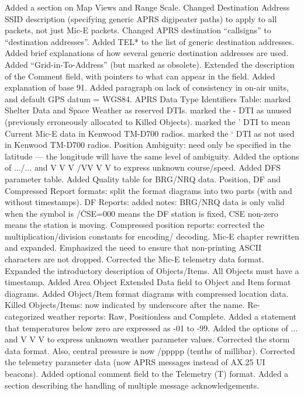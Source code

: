 \begin{itemize}
Added a section on Map Views and Range Scale.
Changed Destination Address SSID description (specifying generic APRS digipeater paths)
to apply to all packets, not just Mic-E packets.
Changed APRS destination “callsigns” to “destination addresses”.
Added TEL* to the list of generic destination addresses.
Added brief explanations of how several generic destination addresses are used.
Added “Grid-in-To-Address” (but marked as obsolete).
Extended the description of the Comment field, with pointers to what can appear in the field.
Added explanation of base 91.
Added paragraph on lack of consistency in on-air units, and default GPS datum = WGS84.
APRS Data Type Identifiers Table:
marked Shelter Data and Space Weather as reserved DTIs.
marked the - DTI as unused (previously erroneously allocated to Killed Objects).
marked the ' DTI to mean Current Mic-E data in Kenwood TM-D700 radios.
marked the ‘ DTI as not used in Kenwood TM-D700 radios.
Position Ambiguity: need only be specified in the latitude — the longitude will have the same
level of ambiguity.
Added the options of .../... and V V V /VV V V to express unknown course/speed.
Added DFS parameter table.
Added Quality table for BRG/NRQ data.
Position, DF and Compressed Report formats: split the format diagrams into two parts (with
and without timestamps).
DF Reports: added notes:
BRG/NRQ data is only valid when the symbol is /\.
CSE=000 means the DF station is fixed, CSE non-zero means the station is moving.
Compressed position reports: corrected the multiplication/division constants for encoding/
decoding.
Mic-E chapter rewritten and expanded. Emphasized the need to ensure that non-printing
ASCII characters are not dropped. Corrected the Mic-E telemetry data format.
Expanded the introductory description of Objects/Items. All Objects must have a timestamp.
Added Area Object Extended Data field to Object and Item format diagrams.
Added Object/Item format diagrams with compressed location data.
Killed Objects/Items: now indicated by underscore after the name.
Re-categorized weather reports: Raw, Positionless and Complete.
Added a statement that temperatures below zero are expressed as -01 to -99.
Added the options of ... and V V V to express unknown weather parameter values.
Corrected the storm data format. Also, central pressure is now /ppppp (tenths of millibar).
Corrected the telemetry parameter data (now APRS messages instead of AX.25 UI beacons).
Added optional comment field to the Telemetry (T) format.
Added a section describing the handling of multiple message acknowledgements.

\end{itemize}
